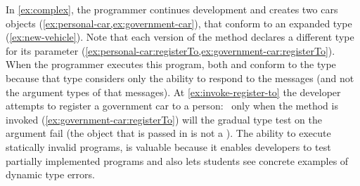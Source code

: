 In \cref{ex:complex}, 
the programmer continues development and creates two cars objects 
(\cref{ex:personal-car,ex:government-car}),
that conform to an expanded  type (\cref{ex:new-vehicle}).
Note that each version of the  method
declares a different type for its parameter
(\cref{ex:personal-car:registerTo,ex:government-car:registerTo}).
When the programmer executes this program,
both  and  conform to the type
 because that type considers only the ability to respond
to the   messages
(and not the argument types of that messages).
At \cref{ex:invoke-register-to} the developer
attempts to register a government car to a person:%
~only when the method is invoked (\cref{ex:government-car:registerTo})
will the gradual type test on the argument fail
(the object that is passed in is not a ).
The ability to execute statically invalid programs,
is valuable because 
it enables developers to test
partially implemented programs and also
lets students see concrete examples of dynamic type errors.



